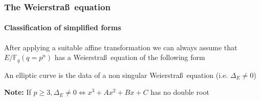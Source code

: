 \documentclass[10pt,final]{beamer} %
\newcommand{\F}{\mathbb F}
\theoremstyle{definition}
\begin{document}
\begin{frame}
\frametitle{The Weierstra\ss\ equation}
\framesubtitle{Classification of simplified forms}

After applying a suitable affine transformation we can always assume that $E/\F_q (q=p^n)$
has a Weierstra\ss\ equation of the following form\pause

\begin{scriptsize}
\end{scriptsize}\pause

\begin{definition} An elliptic curve is the data of a non
singular Weierstra\ss\ equation (i.e. $\Delta_E\neq0$)
\end{definition}\pause

\small{
\alert{\textbf{Note:} If $p\ge3, \Delta_E\neq0\Leftrightarrow x^3+Ax^2+Bx+C$ has {no} double root}}
\end{frame}
\end{document}
